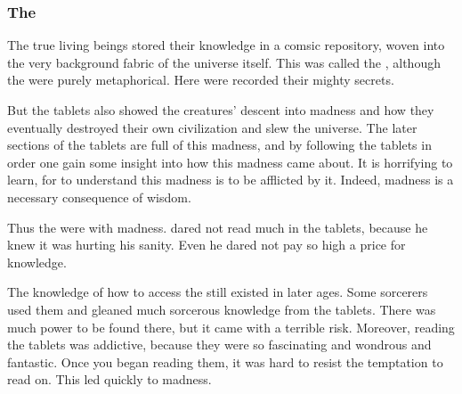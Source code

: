 




\subsubsection{The \UmajaTablets}
\index{\UmajaTablets}
The true living beings stored their knowledge in a comsic repository, woven into the very background fabric of the universe itself.
This was called the \UmajaTablets, although the  were purely metaphorical.
Here were recorded their mighty secrets.

But the tablets also showed the creatures' descent into madness and how they eventually destroyed their own civilization and slew the universe. 
The later sections of the tablets are full of this madness, and by following the tablets in order one gain some insight into how this madness came about. 
It is horrifying to learn, for to understand this madness is to be afflicted by it.
Indeed, madness is a necessary consequence of wisdom. 

Thus the \UmajaTablets were  with madness. 
\Sethicus dared not read much in the tablets, because he knew it was hurting his sanity. 
Even he dared not pay so high a price for knowledge. 

The knowledge of how to access the \UmajaTablets still existed in later ages. 
Some sorcerers used them and gleaned much sorcerous knowledge from the tablets.
There was much power to be found there, but it came with a terrible risk.
Moreover, reading the tablets was addictive, because they were so fascinating and wondrous and fantastic. 
Once you began reading them, it was hard to resist the temptation to read on.
This led quickly to madness. 









